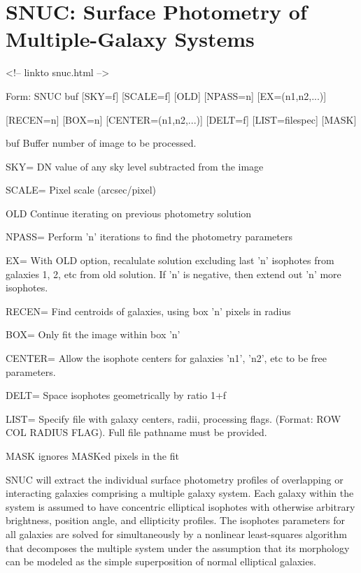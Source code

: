 \section{SNUC: Surface Photometry of Multiple-Galaxy Systems}
\begin{rawhtml}
<!-- linkto snuc.html -->
\end{rawhtml}
\begin{command} 
  \item[Form: SNUC buf {[SKY=f]} {[SCALE=f]} {[OLD]} {[NPASS=n]} 
       {[EX=(n1,n2,...)]}\hfill]{}
  \item{{[RECEN=n]} {[BOX=n]} {[CENTER=(n1,n2,...)]} {[DELT=f]} 
       {[LIST=filespec]} {[MASK]}}
  \item[buf]{Buffer number of image to be processed.}
  \item[SKY=]{DN value of any sky level subtracted from the image}
  \item[SCALE=]{Pixel scale (arcsec/pixel)}
  \item[OLD]{Continue iterating on previous photometry solution}
  \item[NPASS=]{Perform 'n' iterations to find the photometry parameters}
  \item[EX=]{With OLD option, recalulate solution excluding last 'n'
       isophotes from galaxies 1, 2, etc from old solution. If
       'n' is negative, then extend out 'n' more isophotes.}
  \item[RECEN=]{Find centroids of galaxies, using box 'n' pixels in radius}
  \item[BOX=]{Only fit the image within box 'n'}
  \item[CENTER=]{Allow the isophote centers for galaxies 'n1', 'n2', etc
       to be free parameters.}
  \item[DELT=]{Space isophotes geometrically by ratio 1+f}
  \item[LIST=]{Specify file with galaxy centers, radii, processing flags.
       (Format: ROW COL RADIUS FLAG). Full file pathname must be
       provided.}
  \item[MASK]{ignores MASKed pixels in the fit}
\end{command}

SNUC will extract the individual surface photometry profiles of overlapping
or interacting galaxies comprising a multiple galaxy system.  Each galaxy
within the system is assumed to have concentric elliptical isophotes with
otherwise arbitrary brightness, position angle, and ellipticity
profiles. The isophotes parameters for all galaxies are solved for
simultaneously by a nonlinear least-squares algorithm that decomposes the
multiple system under the assumption that its morphology can be modeled as
the simple superposition of normal elliptical galaxies.
 
